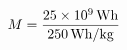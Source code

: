 \documentclass[preview]{standalone}
\begin{document}
\begin{align*}
\special{dvisvgm:raw <g id='unique000'>}M = \frac{25\times10^9\,\mathrm{Wh}}{250\,\mathrm{Wh/kg}}\special{dvisvgm:raw </g>}
\end{align*}
\end{document}
